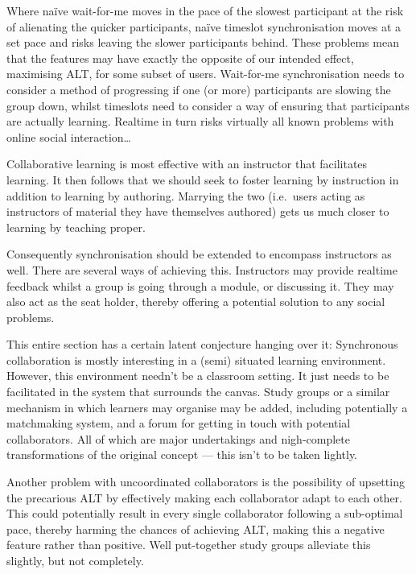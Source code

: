 \documentclass{article}
\begin{document}
\begin{multicols}{2}
Where naïve wait-for-me moves in the pace of the slowest participant at the 
risk of alienating the quicker participants, naïve timeslot synchronisation 
moves at a set pace and risks leaving the slower participants behind. These 
problems mean that the features may have exactly the opposite of our intended 
effect, maximising ALT, for some subset of users. Wait-for-me synchronisation 
needs to consider a method of progressing if one (or more) participants are 
slowing the group down, whilst timeslots need to consider a way of ensuring 
that participants are actually learning. Realtime in turn risks virtually all 
known problems with online social interaction\ldots

Collaborative learning is most effective with an instructor that facilitates 
learning\cite{gokhale1995collaborative}. It then follows that we should seek 
to foster learning by instruction in addition to learning by authoring. 
Marrying the two (i.e.\ users acting as instructors of material they have 
themselves authored) gets us much closer to learning by teaching proper.

Consequently synchronisation should be extended to encompass instructors as 
well. There are several ways of achieving this. Instructors may provide 
realtime feedback whilst a group is going through a module, or discussing it. 
They may also act as the seat holder, thereby offering a potential solution to 
any social problems.

This entire section has a certain latent conjecture hanging over it: 
Synchronous collaboration is mostly interesting in a (semi) situated learning 
environment. However, this environment needn't be a classroom setting. It just
needs to be facilitated in the system that surrounds the canvas. Study groups 
or a similar mechanism in which learners may organise may be added, including 
potentially a matchmaking system, and a forum for getting in touch with 
potential collaborators. All of which are major undertakings and nigh-complete 
transformations of the original concept --- this isn't to be taken lightly.

Another problem with uncoordinated collaborators is the possibility of 
upsetting the precarious ALT by effectively making each collaborator adapt to 
each other. This could potentially result in every single collaborator 
following a sub-optimal pace, thereby harming the chances of achieving ALT, 
making this a negative feature rather than positive. Well put-together study 
groups alleviate this slightly, but not completely.


\end{multicols}
\end{document}
